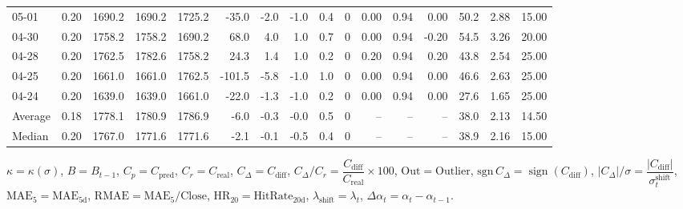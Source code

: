 \begin{threeparttable}
{\begin{tabular}{lrrrrrrrrrrrrrrr}
  05-01 &     0.20 & 1690.2 & 1690.2 & 1725.2 &      -35.0 &           -2.0 &                     -1.0 &                 0.4 &              0 &       0.00 &      0.94 &           0.00 &             50.2 &            2.88 &                  15.00 \\
  04-30 &     0.20 & 1758.2 & 1758.2 & 1690.2 &       68.0 &            4.0 &                      1.0 &                 0.7 &              0 &       0.00 &      0.94 &          -0.20 &             54.5 &            3.26 &                  20.00 \\
  04-28 &     0.20 & 1762.5 & 1782.6 & 1758.2 &       24.3 &            1.4 &                      1.0 &                 0.2 &              0 &       0.20 &      0.94 &           0.20 &             43.8 &            2.54 &                  25.00 \\
  04-25 &     0.20 & 1661.0 & 1661.0 & 1762.5 &     -101.5 &           -5.8 &                     -1.0 &                 1.0 &              0 &       0.00 &      0.94 &           0.00 &             46.6 &            2.63 &                  25.00 \\
  04-24 &     0.20 & 1639.0 & 1639.0 & 1661.0 &      -22.0 &           -1.3 &                     -1.0 &                 0.2 &              0 &       0.00 &      0.94 &           0.00 &             27.6 &            1.65 &                  25.00 \\
Average &     0.18 & 1778.1 & 1780.9 & 1786.9 &       -6.0 &           -0.3 &                     -0.0 &                 0.5 &              0 &         -- &        -- &             -- &             38.0 &            2.13 &                  14.50 \\
 Median &     0.20 & 1767.0 & 1771.6 & 1771.6 &       -2.1 &           -0.1 &                     -0.5 &                 0.4 &              0 &         -- &        -- &             -- &             38.9 &            2.16 &                  15.00 \\
\bottomrule
\end{tabular}
}
\begin{tablenotes}\footnotesize
\item $\kappa=\kappa(\sigma)$, $B=B_{t-1}$, $C_p=C_{\text{pred}}$, $C_r=C_{\text{real}}$, $C_\Delta=C_{\text{diff}}$, $C_\Delta/C_r=\dfrac{C_{\text{diff}}}{C_{\text{real}}}\times100$, $\mathrm{Out}=\text{Outlier}$, $\mathrm{sgn}\,C_\Delta=\operatorname{sign}(C_{\text{diff}})$, $|C_\Delta|/\sigma=\dfrac{|C_{\text{diff}}|}{\sigma_t^{\text{shift}}}$, $\mathrm{MAE}_5=\mathrm{MAE}_{5\text{d}}$, $\mathrm{RMAE}= \mathrm{MAE}_5 / \text{Close}$, $\mathrm{HR}_{20}=\mathrm{HitRate}_{20\text{d}}$, 
$\lambda_{\text{shift}}=\lambda_t$, 
$\Delta\alpha_t=\alpha_t-\alpha_{t-1}$.
\end{tablenotes}
\end{threeparttable}
\endgroup

